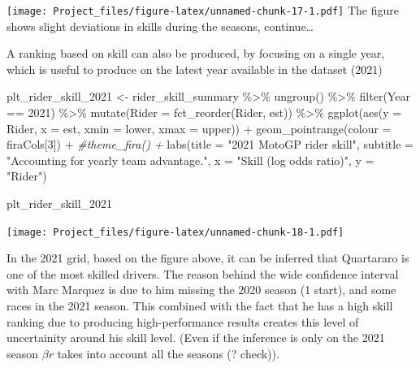 \documentclass[
]{article}
\newenvironment{Shaded}{\begin{snugshade}}{\end{snugshade}}
\newcommand{\AttributeTok}[1]{\textcolor[rgb]{0.77,0.63,0.00}{#1}}
\newcommand{\CommentTok}[1]{\textcolor[rgb]{0.56,0.35,0.01}{\textit{#1}}}
\newcommand{\DecValTok}[1]{\textcolor[rgb]{0.00,0.00,0.81}{#1}}
\newcommand{\FunctionTok}[1]{\textcolor[rgb]{0.00,0.00,0.00}{#1}}
\newcommand{\NormalTok}[1]{#1}
\newcommand{\OtherTok}[1]{\textcolor[rgb]{0.56,0.35,0.01}{#1}}
\newcommand{\SpecialCharTok}[1]{\textcolor[rgb]{0.00,0.00,0.00}{#1}}
\newcommand{\StringTok}[1]{\textcolor[rgb]{0.31,0.60,0.02}{#1}}
\begin{document}
\texttt{[image: Project\_files/figure-latex/unnamed-chunk-17-1.pdf]} The
figure shows slight deviations in skills during the seasons,
continue\ldots{}

A ranking based on skill can also be produced, by focusing on a single
year, which is useful to produce on the latest year available in the
dataset (2021)

\begin{Shaded}
\begin{Highlighting}[]
\NormalTok{plt\_rider\_skill\_2021 }\OtherTok{\textless{}{-}}
\NormalTok{  rider\_skill\_summary }\SpecialCharTok{\%\textgreater{}\%}
  \FunctionTok{ungroup}\NormalTok{() }\SpecialCharTok{\%\textgreater{}\%}
  \FunctionTok{filter}\NormalTok{(Year }\SpecialCharTok{==} \DecValTok{2021}\NormalTok{) }\SpecialCharTok{\%\textgreater{}\%}
  \FunctionTok{mutate}\NormalTok{(}\AttributeTok{Rider =} \FunctionTok{fct\_reorder}\NormalTok{(Rider, est)) }\SpecialCharTok{\%\textgreater{}\%}
  \FunctionTok{ggplot}\NormalTok{(}\FunctionTok{aes}\NormalTok{(}\AttributeTok{y =}\NormalTok{ Rider, }\AttributeTok{x =}\NormalTok{ est, }\AttributeTok{xmin =}\NormalTok{ lower, }\AttributeTok{xmax =}\NormalTok{ upper)) }\SpecialCharTok{+}
  \FunctionTok{geom\_pointrange}\NormalTok{(}\AttributeTok{colour =}\NormalTok{ firaCols[}\DecValTok{3}\NormalTok{]) }\SpecialCharTok{+}
  \CommentTok{\#theme\_fira() +}
  \FunctionTok{labs}\NormalTok{(}\AttributeTok{title =} \StringTok{"2021 MotoGP rider skill"}\NormalTok{,}
       \AttributeTok{subtitle =} \StringTok{"Accounting for yearly team advantage."}\NormalTok{,}
       \AttributeTok{x =} \StringTok{"Skill (log odds ratio)"}\NormalTok{,}
       \AttributeTok{y =} \StringTok{"Rider"}\NormalTok{)}

\NormalTok{plt\_rider\_skill\_2021}
\end{Highlighting}
\end{Shaded}

\texttt{[image: Project\_files/figure-latex/unnamed-chunk-18-1.pdf]}

In the 2021 grid, based on the figure above, it can be inferred that
Quartararo is one of the most skilled drivers. The reason behind the
wide confidence interval with Marc Marquez is due to him missing the
2020 season (1 start), and some races in the 2021 season. This combined
with the fact that he has a high skill ranking due to producing
high-performance results creates this level of uncertainity around his
skill level. (Even if the inference is only on the 2021 season
\(\beta{r}\) takes into account all the seasons (? check)).
\end{document}
